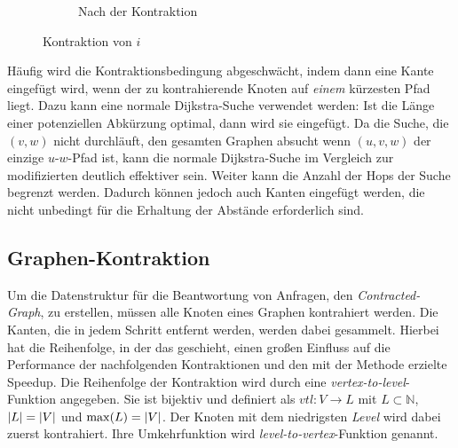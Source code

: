 \begin{figure}[h!]
\begin{subfigure}[b]{0.49\textwidth}
{
    }
    \caption{Nach der Kontraktion}
  \end{subfigure}
  \caption{Kontraktion von $i$}
  \label{graphs:fig:example_contraction}
\end{figure}

Häufig wird die Kontraktionsbedingung abgeschwächt, indem dann eine Kante eingefügt wird, wenn der zu kontrahierende Knoten auf \emph{einem} kürzesten Pfad liegt.
Dazu kann eine normale Dijkstra-Suche verwendet werden: Ist die Länge einer potenziellen Abkürzung optimal, dann wird sie eingefügt.
Da die Suche, die $(v, w)$ nicht durchläuft, den gesamten Graphen absucht wenn $(u, v, w)$ der einzige $u$-$w$-Pfad ist, kann die normale Dijkstra-Suche im Vergleich zur modifizierten deutlich effektiver sein.
Weiter kann die Anzahl der Hops der Suche begrenzt werden.
Dadurch können jedoch auch Kanten eingefügt werden, die nicht unbedingt für die Erhaltung der Abstände erforderlich sind.

\subsection{Graphen-Kontraktion}

Um die Datenstruktur für die Beantwortung von Anfragen, den \emph{Contracted-Graph}, zu erstellen, müssen alle Knoten eines Graphen kontrahiert werden. Die Kanten, die in jedem Schritt entfernt werden, werden dabei gesammelt.
Hierbei hat die Reihenfolge, in der das geschieht, einen großen Einfluss auf die Performance der nachfolgenden Kontraktionen und den mit der Methode erzielte Speedup.
Die Reihenfolge der Kontraktion wird durch eine \emph{vertex-to-level}-Funktion angegeben.
Sie ist bijektiv und definiert als ${vtl} \colon V \to L$ mit $L \subset \mathbb{N}$, $\abs{L} = \abs{V}$ und $\max(L) = \abs{V}$.
Der Knoten mit dem niedrigsten \emph{Level} wird dabei zuerst kontrahiert.
Ihre Umkehrfunktion wird \emph{level-to-vertex}-Funktion genannt.

